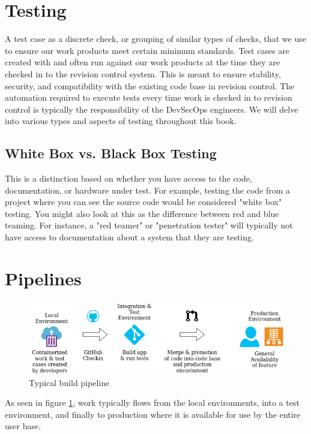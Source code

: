 \section{Testing}

\justifying
A test case as a discrete check, or grouping of similar types of checks,
that we use to ensure our work products meet certain minimum standards. Test cases are created with
and often run against our work products at the time they are checked in to the revision control system.
This is meant to ensure stability, security, and compatibility with the existing code base in revision
control. The automation required to execute tests every time work is checked in to
revision control is typically the responsibility of the DevSecOps engineers. We will delve into various
types and aspects of testing throughout this book.

\subsection{White Box vs. Black Box Testing}

\justifying
This is a distinction based on whether you have access to the code, documentation, or hardware under test.
For example, testing the code from a project where you can see the source code would be considered "white box"
testing. You might also look at this as the difference between red and blue
teaming. For instance, a "red teamer" or "penetration tester" will typically not have
access to documentation about a system that they are testing.

\section{Pipelines}

\begin{figure}[!htb]
\centering
\includegraphics[scale=0.63]{images/flow.png}
\caption{Typical build pipeline}
\label{pipeline}
\end{figure}

\justifying
As seen in figure \ref{pipeline}, work typically flows from the local environments, into a test
environment, and finally to production where it is available for use by the entire user base.

